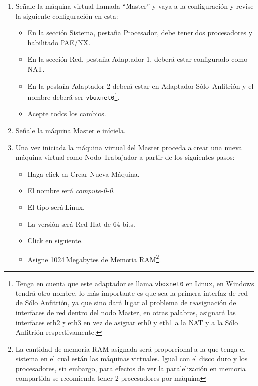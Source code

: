 \begin{enumerate}
\item Señale la máquina virtual llamada ``Master'' y vaya a la configuración y revise la siguiente configuración en esta:

\begin{itemize}

	\item En la sección Sistema, pestaña Procesador, debe tener dos procesadores y habilitado PAE/NX.

	\item En la sección Red, pestaña Adaptador 1, deberá estar configurado como NAT. 

	\item En la pestaña Adaptador 2 deberá estar en Adaptador Sólo--Anfitrión y el nombre deberá ser \texttt{vboxnet0}\footnote{Tenga en cuenta que este adaptador se llama \texttt{vboxnet0} en Linux, en Windows tendrá otro nombre, lo más importante es que sea la primera interfaz de red de Sólo Anfitrión, ya que sino dará lugar al problema de reasignación de interfaces de red dentro del nodo Master, en otras palabras, asignará las interfaces eth2 y eth3 en vez de asignar eth0 y eth1 a la NAT y a la Sólo Anfitrión respectivamente.}.

	\item Acepte todos los cambios.

\end{itemize}

\item Señale la máquina Master e iníciela.

\item Una vez iniciada la máquina virtual del Master proceda a crear una nueva máquina virtual como Nodo Trabajador a partir de los siguientes pasos:

\begin{itemize}
	\item Haga click en Crear Nueva Máquina.

	\item El nombre será \textit{compute-0-0}.

	\item El tipo será Linux.

	\item La versión será Red Hat de 64 bits.

	\item Click en siguiente.

	\item Asigne 1024 Megabytes de Memoria RAM\footnote{La cantidad de memoria RAM asignada será proporcional a la que tenga el sistema en el cual están las máquinas virtuales. Igual con el disco duro y los procesadores, sin embargo, para efectos de ver la paralelización en memoria compartida se recomienda tener 2 procesadores por máquina}.


\end{itemize}
\end{enumerate}
